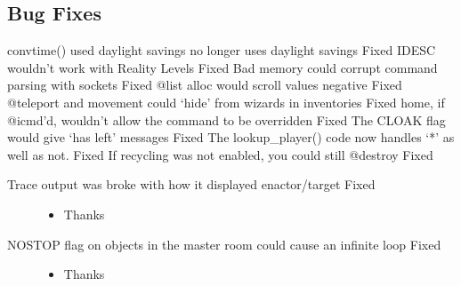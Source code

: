 \documentclass[letterpaper,10pt,english]{sphinxmanual}
\begin{document}
\subsection{Bug Fixes}
\label{\detokenize{changelog:id32}}
\sphinxAtStartPar
convtime() used daylight savings \sphinxhyphen{} no longer uses daylight savings \sphinxhyphen{} Fixed
IDESC wouldn’t work with Reality Levels \sphinxhyphen{} Fixed
Bad memory could corrupt command parsing with sockets \sphinxhyphen{} Fixed
@list alloc would scroll values negative \sphinxhyphen{} Fixed
@teleport and movement could ‘hide’ from wizards in inventories \sphinxhyphen{} Fixed
home, if @icmd’d, wouldn’t allow the command to be overridden \sphinxhyphen{} Fixed
The CLOAK flag would give ‘has left’ messages \sphinxhyphen{} Fixed
The lookup\_player() code now handles ‘*’ as well as not. \sphinxhyphen{} Fixed
If recycling was not enabled, you could still @destroy \sphinxhyphen{} Fixed
\begin{description}
\item[{Trace output was broke with how it displayed enactor/target \sphinxhyphen{} Fixed}] \leavevmode\begin{itemize}
\item {} 
\sphinxAtStartPar
Thanks 

\end{itemize}

\item[{NOSTOP flag on objects in the master room could cause an infinite loop \sphinxhyphen{} Fixed}] \leavevmode\begin{itemize}
\item {} 
\sphinxAtStartPar
Thanks 

\end{itemize}

\end{description}
\end{document}

